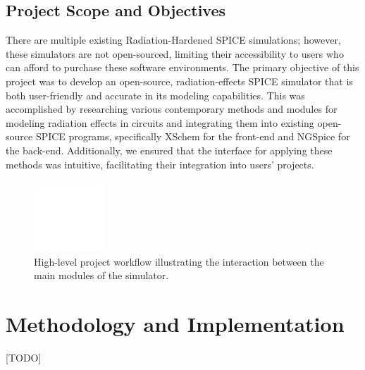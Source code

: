 \documentclass[conference]{IEEEtran}
\begin{document}
\subsection{Project Scope and Objectives}
There are multiple existing Radiation-Hardened SPICE simulations; however, these simulators are not open-sourced, limiting their accessibility to users who can afford to purchase these software environments. The primary objective of this project was to develop an open-source, radiation-effects SPICE simulator that is both user-friendly and accurate in its modeling capabilities. This was accomplished by researching various contemporary methods and modules for modeling radiation effects in circuits and integrating them into existing open-source SPICE programs, specifically XSchem for the front-end and NGSpice for the back-end. Additionally, we ensured that the interface for applying these methods was intuitive, facilitating their integration into users' projects.

\begin{figure}[htbp]
\centering
\includegraphics[width=0.8\linewidth]{project_flow_diagram_placeholder.png}
\caption{High-level project workflow illustrating the interaction between the main modules of the simulator.}
\label{fig:project_flow}
\end{figure}

\section{Methodology and Implementation}
[TODO]
\end{document}
